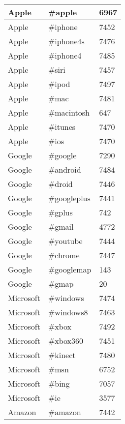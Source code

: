 \documentclass[12pt]{article}
\begin{document}
\begin{table}
\begin{center}
    \begin{tabular}{ | l || l | l | }
        \hline
        Apple &  \#apple & 6967 \\ \hline
        Apple &  \#iphone & 7452 \\ \hline
        Apple &  \#iphone4s & 7476 \\ \hline
        Apple &  \#iphone4 & 7485 \\ \hline
        Apple &  \#siri & 7457 \\ \hline
        Apple &  \#ipod & 7497 \\ \hline
        Apple &  \#mac & 7481 \\ \hline
        Apple &  \#macintosh & 647 \\ \hline
        Apple &  \#itunes & 7470 \\ \hline
        Apple &  \#ios & 7470 \\ \hline
        Google &  \#google & 7290 \\ \hline
        Google &  \#android & 7484 \\ \hline
        Google &  \#droid & 7446 \\ \hline
        Google &  \#googleplus & 7441 \\ \hline
        Google &  \#gplus & 742 \\ \hline
        Google &  \#gmail & 4772 \\ \hline
        Google &  \#youtube & 7444 \\ \hline
        Google &  \#chrome & 7447 \\ \hline
        Google &  \#googlemap & 143 \\ \hline
        Google &  \#gmap & 20 \\ \hline
        Microsoft &  \#windows & 7474 \\ \hline
        Microsoft &  \#windows8 & 7463 \\ \hline
        Microsoft &  \#xbox & 7492 \\ \hline
        Microsoft &  \#xbox360 & 7451 \\ \hline
        Microsoft &  \#kinect & 7480 \\ \hline
        Microsoft &  \#msn & 6752 \\ \hline
        Microsoft &  \#bing & 7057 \\ \hline
        Microsoft &  \#ie & 3577 \\ \hline
        Amazon &  \#amazon & 7442 \\ \hline

\end{tabular}
\end{center}
\end{table}
\end{document}
